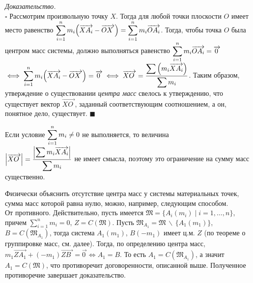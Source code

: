 \documentclass[14pt]{extarticle}
\let\vecarrow\overrightarrow
\theoremstyle{definition}
\theoremstyle{theorem}
\renewenvironment{proof}
    {\noindent \textit{Доказательство.}\\
	\indent $\square$}
	{ $\blacksquare$\\ }
\newenvironment{note}
    {\noindent {\normalfont\fontsize{14}{14}\textbf{\textit{Примечание.}}}}
\DeclarePairedDelimiter\abs{\lvert}{\rvert}
\begin{document}
{
\begin{proof}
    Рассмотрим произвольную точку $X$. Тогда для любой  точки
	плоскости $O$ имеет место равенство $\mathlarger{\sum_{i=1}^{n}
	m_i  \Big(\vecarrow{XA_i} - \vecarrow{OX_{\, \,}}\Big) = \sum_{i=1}^{n} 
	m_i  \vecarrow{OA_i}}$. Тогда, чтобы точка $O$ была 
	центром масс системы, должно выполняться равенство
	$\mathlarger{\sum_{i=1}^{n} 
	m_i  \vecarrow{OA_i}} = \vecarrow{0_{\,}}$ $\iff \mathlarger{\sum_{i=1}^{n} m_i 
	\Big(\vecarrow{XA_i} - \vecarrow{OX_{\, \,}}\Big) = \vecarrow{0_{\,}} \iff 
    \vecarrow{XO_{\;}} = \frac{\displaystyle \sum \Big(m_i
	\vecarrow{XA_i} \Big)}{\displaystyle\sum m_i}}$. Таким образом, %
    утверждение о существовании \textit{центра масс} свелось к утверждению, что существует
	вектор $\vecarrow{XO_{\;}}$, заданный соответствующим соотношением, а он,
	понятное дело, существует.
\end{proof}
\par}

\begin{note}
	{
    Если условие $\mathlarger{\sum_{i=1}^{n} m_i \ne 0}$ не выполняется,
	то величина \\
	$\mathlarger{\abs*{\vecarrow{XO_{\;}}} = \frac{\displaystyle
    \abs*{\sum m_i \vecarrow{XA_i}}}{\displaystyle \sum m_i}}$
    не имеет смысла, поэтому это ограничение на сумму  масс %
    существенно. \par} \vspace{2mm}
    \noindent
    Физически объяснить отсутствие центра масс у системы материальных точек,
    сумма масс которой равна нулю, можно, например, следующим способом. \\
    От противного. Действительно, пусть имеется
    \(\mathfrak{M} = \big\{A_i(m_i) \mid i =
    1, \dots , n \big\}\), причем  \(\displaystyle \sum_{i = 1}^{n}
    m_i = 0\), \(Z = C(\mathfrak{M})\). 
    Пусть \(\mathfrak{M}_{A_1} = \mathfrak{M} \, \backslash \, 
    \{ A_1(m_1) \}\), \(B = C \left( \mathfrak{M}_{A_1}\right) \), 
    тогда система %
    \(A_1(m_1)\), \(B(-m_1)\) имеет ц.м. \(Z\) (по теореме о 
    группировке масс, см. далее). 
    Тогда, по определению центра масс,
    \(m_1 \vecarrow{ZA_1} + (-m_1) \vecarrow{ZB_{\, \,}} = 
    \vecarrow{0_{\,}} \iff A_1 = B\). 
    То есть \(A_1 = C \left( \mathfrak{M}_{A_1} \right)\), а значит 
    \(A_1 = C(\mathfrak{M})\), что противоречит договоренности, 
    описанной выше. Полученное противоречие завершает доказательство. \\
    

\end{note}
\end{document}
